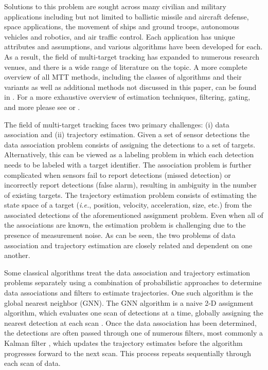 \documentclass[journal]{IEEEtran}
\begin{document}
Solutions to this problem are sought across many civilian and military applications including but not limited to ballistic missile and aircraft defense, space applications, the movement of ships and ground troops, autonomous vehicles and robotics, and air traffic control. Each application has unique attributes and assumptions, and various algorithms have been developed for each. As a result, the field of multi-target tracking has expanded to numerous research venues, and there is a wide range of literature on the topic. A more complete overview of all MTT methods, including the classes of algorithms and their variants as well as additional methods not discussed in this paper, can be found in \cite{MTT-Taxonomy}. For a more exhaustive overview of estimation techniques, filtering, gating, and more please see \cite{Bar-Shalom_MTT} or \cite{Bar-Shalom_Estimation}.

The field of multi-target tracking faces two primary challenges: (i) data association and (ii) trajectory estimation.  Given a set of sensor detections the data association problem consists of assigning the detections to a set of targets. Alternatively, this can be viewed as a labeling problem in which each detection needs to be labeled with a target identifier. The association problem is further complicated when sensors fail to report detections (missed detection) or incorrectly report detections (false alarm), resulting in ambiguity in the number of existing targets. The trajectory estimation problem consists of estimating the state space of a target (\textit{i.e.}, position, velocity, acceleration, size, etc.) from the associated detections of the aforementioned assignment problem. Even when all of the associations are known, the estimation problem is challenging due to the presence of measurement noise. As can be seen, the two problems of data association and trajectory estimation are closely related and dependent on one another. 

Some classical algorithms treat the data association and trajectory estimation problems separately using a combination of probabilistic approaches to determine data associations and filters to estimate trajectories. One such algorithm is the global nearest neighbor (GNN). The GNN algorithm is a naive 2-D assignment algorithm, which evaluates one scan of detections at a time, globally assigning the nearest detection at each scan \cite{GNN}. Once the data association has been determined, the detections are often passed through one of numerous filters, most commonly a Kalman filter \cite{Kalman}, which updates the trajectory estimates before the algorithm progresses forward to the next scan. This process repeats sequentially through each scan of data.
\end{document}
